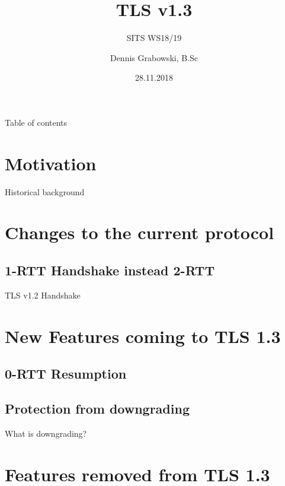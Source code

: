\documentclass{f4_beamer_metropolis}
\title{TLS v1.3}
\subtitle{SITS WS18/19}
\author{Dennis Grabowski, B.Sc}
\date{28.11.2018}
\begin{document}
\begin{frame}{Table of contents}
    \tableofcontents[hideallsubsections]
  \end{frame}

\section{Motivation}

\begin{frame}{Historical background}

\end{frame}

\section{Changes to the current protocol}

\subsection{1-RTT Handshake instead 2-RTT}

\begin{frame}{TLS v1.2 Handshake}

\end{frame}

\section{New Features coming to TLS 1.3}

\subsection{0-RTT Resumption}

\begin{frame}{}

\end{frame}

\subsection{Protection from downgrading}

\begin{frame}{What is downgrading?}

\end{frame}

\section{Features removed from TLS 1.3}
\end{document}
